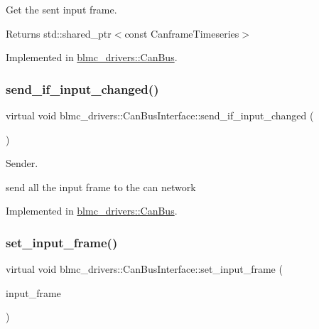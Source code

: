 Get the sent input frame. 

\begin{DoxyReturn}{Returns}
std\+::shared\+\_\+ptr$<$const Canframe\+Timeseries$>$ 
\end{DoxyReturn}


Implemented in \hyperlink{classblmc__drivers_1_1CanBus_a862e9898a6607ac2e00e712c30e7f348}{blmc\+\_\+drivers\+::\+Can\+Bus}.

\mbox{\label{classblmc__drivers_1_1CanBusInterface_aa97ce2a204aa8354b8ea62af5f3820a2}} 
\subsubsection{\texorpdfstring{send\+\_\+if\+\_\+input\+\_\+changed()}{send\_if\_input\_changed()}}
{\footnotesize\ttfamily virtual void blmc\+\_\+drivers\+::\+Can\+Bus\+Interface\+::send\+\_\+if\+\_\+input\+\_\+changed (\begin{DoxyParamCaption}{ }\end{DoxyParamCaption})\hspace{0.3cm}{\ttfamily [pure virtual]}}



Sender. 

send all the input frame to the can network 

Implemented in \hyperlink{classblmc__drivers_1_1CanBus_acf90b96ca5727f9ecb328ce20d7a2cbc}{blmc\+\_\+drivers\+::\+Can\+Bus}.

\mbox{\label{classblmc__drivers_1_1CanBusInterface_acf9305b548421e837950a0988172d57a}} 
\subsubsection{\texorpdfstring{set\+\_\+input\+\_\+frame()}{set\_input\_frame()}}
{\footnotesize\ttfamily virtual void blmc\+\_\+drivers\+::\+Can\+Bus\+Interface\+::set\+\_\+input\+\_\+frame (\begin{DoxyParamCaption}\item[{const \hyperlink{classblmc__drivers_1_1CanBusFrame}{Can\+Bus\+Frame} \&}]{input\+\_\+frame }\end{DoxyParamCaption})\hspace{0.3cm}{\ttfamily [pure virtual]}}



